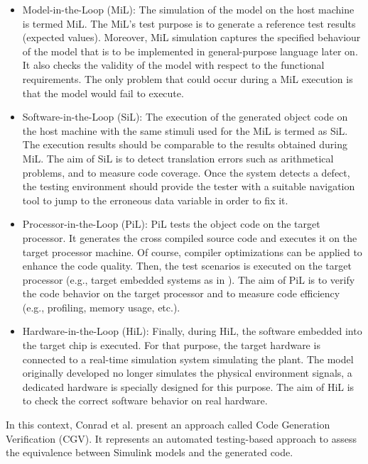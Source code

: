 \begin{itemize}
	\item Model-in-the-Loop (MiL): 
	The simulation of the model on the host machine is termed MiL. 
    The MiL's test purpose is to generate a reference test results (expected values). Moreover, MiL simulation captures the specified behaviour of the model that is to be implemented in general-purpose language later on. It also checks the validity of the model with respect to the functional requirements. The only problem that could occur during a MiL execution is that the model would fail to execute.

	\item Software-in-the-Loop (SiL): 
	The execution of the generated object code on the host machine with the same stimuli used for the MiL is termed as SiL. The execution results should be comparable to the results obtained during MiL. 
	The aim of SiL is to detect translation errors such as arithmetical problems, and to measure code coverage.
	Once the system detects a defect, the testing environment should provide the tester with a suitable navigation tool to jump to the erroneous data variable in order to fix it.
	
	\item Processor-in-the-Loop (PiL): 
	PiL tests the object code on the target processor. It generates the cross compiled source code and executes it on the target processor machine. Of course, compiler optimizations can be applied to enhance the code quality. Then, the test scenarios is executed on the target processor (e.g., target embedded systems as in \cite{shokry2009model}). The aim of PiL is to verify the code behavior on the target processor and to measure code efficiency (e.g., profiling, memory usage, etc.).
	
	\item Hardware-in-the-Loop (HiL): 
	Finally, during HiL, the software embedded into the target chip is executed. For that purpose, the target hardware is connected to a real-time simulation system simulating the plant. The model originally developed no longer simulates the physical environment signals, a dedicated hardware is specially designed for this purpose. The aim of HiL is to check the correct software behavior on real hardware.
\end{itemize}

In this context, Conrad et al.\cite{conrad2010code,conrad2009testing} present an approach called Code Generation Verification (CGV). It represents an automated testing-based approach to assess the equivalence between Simulink models and the generated code. 

